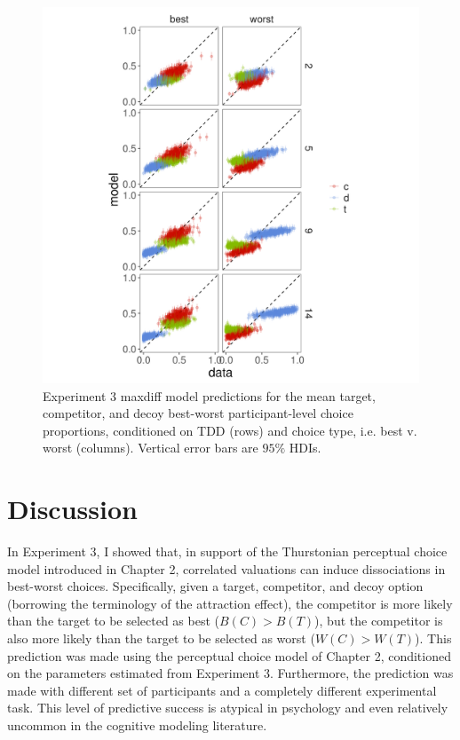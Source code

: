 \begin{figure}
   \includegraphics[width=\linewidth]{figures/maxdiff_1_subjectmeans_model_v_data.jpeg}
   \caption{Experiment 3 maxdiff model predictions for the mean target, competitor, and decoy best-worst participant-level choice proportions, conditioned on TDD (rows) and choice type, i.e. best v. worst (columns). Vertical error bars are $95\%$ HDIs.}
   \label{fig:maxdiff_sub_preds}
\end{figure}

\section{Discussion}
In Experiment 3, I showed that, in support of the Thurstonian perceptual choice model introduced in Chapter 2, correlated valuations can induce dissociations in best-worst choices. Specifically, given a target, competitor, and decoy option (borrowing the terminology of the attraction effect), the competitor is more likely than the target to be selected as best ($B(C)>B(T)$), but the competitor is also more likely than the target to be selected as worst ($W(C)>W(T)$). This prediction was made using the perceptual choice model of Chapter 2, conditioned on the parameters estimated from Experiment 3. Furthermore, the prediction was made with different set of participants and a completely different experimental task. This level of predictive success is atypical in psychology and even relatively uncommon in the cognitive modeling literature. 

